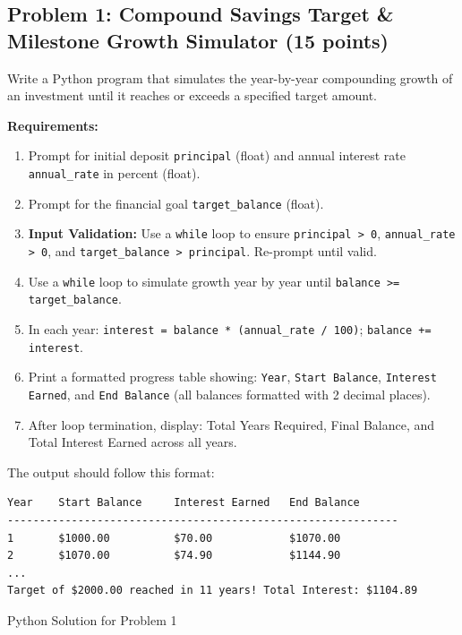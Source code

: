\documentclass[11pt,a4paper]{article}
\begin{document}
\subsection*{Problem 1: Compound Savings Target \& Milestone Growth Simulator (15 points)}
Write a Python program that simulates the year-by-year compounding growth of an investment until it reaches or exceeds a specified target amount.

\textbf{Requirements:}
\begin{enumerate}[leftmargin=2em,label=\arabic*.,itemsep=1pt]
  \item Prompt for initial deposit \texttt{principal} (float) and annual interest rate \texttt{annual\_rate} in percent (float).
  \item Prompt for the financial goal \texttt{target\_balance} (float).
  \item \textbf{Input Validation:} Use a \texttt{while} loop to ensure \texttt{principal > 0}, \texttt{annual\_rate > 0}, and \texttt{target\_balance > principal}. Re-prompt until valid.
  \item Use a \texttt{while} loop to simulate growth year by year until \texttt{balance >= target\_balance}.
  \item In each year: \texttt{interest = balance * (annual\_rate / 100)}; \texttt{balance += interest}.
  \item Print a formatted progress table showing: \texttt{Year}, \texttt{Start Balance}, \texttt{Interest Earned}, and \texttt{End Balance} (all balances formatted with 2 decimal places).
  \item After loop termination, display: Total Years Required, Final Balance, and Total Interest Earned across all years.
\end{enumerate}

The output should follow this format:
\begin{lstlisting}
Year    Start Balance     Interest Earned   End Balance      
-------------------------------------------------------------
1       $1000.00          $70.00            $1070.00         
2       $1070.00          $74.90            $1144.90         
...
Target of $2000.00 reached in 11 years! Total Interest: $1104.89
\end{lstlisting}

\begin{answerbox}[height=13.2cm]{Python Solution for Problem 1}
\end{answerbox}

\newpage
\end{document}
